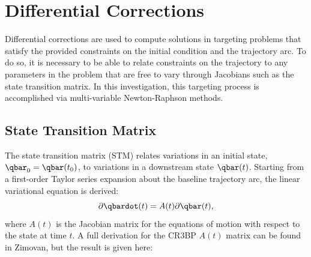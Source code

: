 \section{Differential Corrections}
Differential corrections are used to compute solutions in targeting problems that satisfy the
provided constraints on the initial condition and the trajectory arc. To do so, it is necessary to
be able to relate constraints on the trajectory to any parameters in the problem that are free to
vary through Jacobians such as the state transition matrix. In this investigation, this targeting
process is accomplished via multi-variable Newton-Raphson methods.

\subsection{State Transition Matrix}
The state transition matrix (STM) relates variations in an initial state, $\qbar_{0}=\qbar(t_{0})$,
to variations in a downstream state $\qbar(t)$. Starting from a first-order Taylor series expansion
about the baseline trajectory arc, the linear variational equation is derived:
\begin{equation}
    \partial\qbardot(t)=A(t)\partial\qbar(t),
    \label{eq:linearvariational}
\end{equation}
where $A(t)$ is the Jacobian matrix for the equations of motion with respect to the state at time
$t$. A full derivation for the CR3BP $A(t)$ matrix can be found in Zimovan, but the result is given
here\cite{Zimovan:2017}:
\vfill
